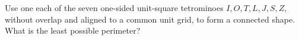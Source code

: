 Use one each of the seven one-sided unit-square tetrominoes $I,O,T,L,J,S,Z$, without overlap and aligned to a common unit grid, to form a connected shape. What is the least possible perimeter?

